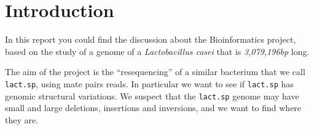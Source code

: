 \newcommand{\lacto}{\textit{Lactobacillus casei}}
\newcommand{\lactolength}{3,079,196}
\newcommand{\filef}[1]{\texttt{#1}}

\chapter{Introduction}
In this report you could find the discussion about the Bioinformatics project,
based on the study of a genome of a \lacto{} that is \textit{\lactolength{}bp}
long.

The aim of the project is the ``resequencing'' of a similar bacterium that we
call \texttt{lact.sp}, using mate pairs reads. In particular we want to see if
\texttt{lact.sp} has genomic structural variations. We suspect that the 
\texttt{lact.sp} genome may have small and large deletions, insertions and
inversions, and we want to find where they are.